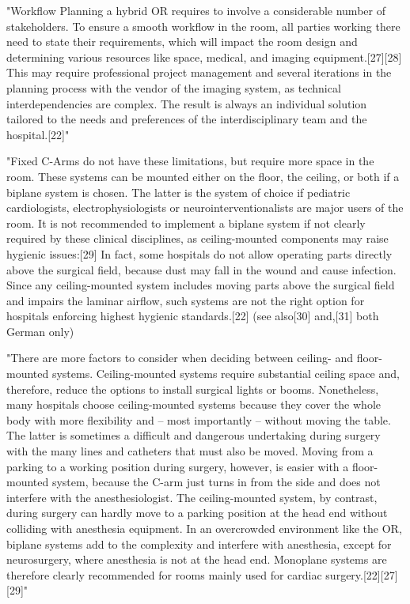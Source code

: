 	"Workflow
	Planning a hybrid OR requires to involve a considerable number of stakeholders. To ensure a smooth workflow in the room, all parties working there need to state their requirements, which will impact the room design and determining various resources like space, medical, and imaging equipment.[27][28] This may require professional project management and several iterations in the planning process with the vendor of the imaging system, as technical interdependencies are complex. The result is always an individual solution tailored to the needs and preferences of the interdisciplinary team and the hospital.[22]"
	
	"Fixed C-Arms do not have these limitations, but require more space in the room. These systems can be mounted either on the floor, the ceiling, or both if a biplane system is chosen. The latter is the system of choice if pediatric cardiologists, electrophysiologists or neurointerventionalists are major users of the room. It is not recommended to implement a biplane system if not clearly required by these clinical disciplines, as ceiling-mounted components may raise hygienic issues:[29] In fact, some hospitals do not allow operating parts directly above the surgical field, because dust may fall in the wound and cause infection. Since any ceiling-mounted system includes moving parts above the surgical field and impairs the laminar airflow, such systems are not the right option for hospitals enforcing highest hygienic standards.[22] (see also[30] and,[31] both German only)
	
	"There are more factors to consider when deciding between ceiling- and floor-mounted systems. Ceiling-mounted systems require substantial ceiling space and, therefore, reduce the options to install surgical lights or booms. Nonetheless, many hospitals choose ceiling-mounted systems because they cover the whole body with more flexibility and – most importantly – without moving the table. The latter is sometimes a difficult and dangerous undertaking during surgery with the many lines and catheters that must also be moved. Moving from a parking to a working position during surgery, however, is easier with a floor-mounted system, because the C-arm just turns in from the side and does not interfere with the anesthesiologist. The ceiling-mounted system, by contrast, during surgery can hardly move to a parking position at the head end without colliding with anesthesia equipment. In an overcrowded environment like the OR, biplane systems add to the complexity and interfere with anesthesia, except for neurosurgery, where anesthesia is not at the head end. Monoplane systems are therefore clearly recommended for rooms mainly used for cardiac surgery.[22][27][29]"
	
